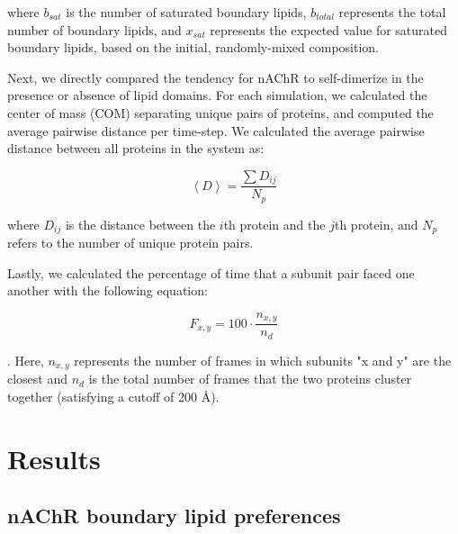 where $b_{sat}$ is the number of saturated boundary lipids, $b_{total}$ represents the total number of boundary lipids, and $x_{sat}$ represents the expected value for saturated boundary lipids, based on the initial, randomly-mixed composition.   



  

Next, we directly compared the tendency for nAChR to self-dimerize in the presence or absence of lipid domains. For each simulation, we calculated the center of mass (COM) separating unique pairs of proteins, and computed the average pairwise distance per time-step. We calculated the average pairwise distance between all proteins in the system as:    


\begin{equation}\label{eq:dimer}
\left\langle D \right\rangle = \frac{\sum D_{ij}}{N_{p}}
\end{equation}

where $D_{ij}$ is the distance between the $i$th protein and the $j$th protein, and $N_{p}$ refers to the number of unique protein pairs. 



Lastly, we calculated the percentage of time that a subunit pair faced one another with the following equation: 

\begin{equation}\label{eq:subunit}
F_{x,y} = 100\cdot \frac{n_{x,y}}{n_d}
\end{equation}

. Here, $n_{x,y}$ represents the number of frames in which subunits "x and y" are the closest and $n_d$ is the total number of frames that the two proteins cluster together (satisfying a cutoff of 200 {\AA}).

\section{Results}

\subsection{nAChR boundary lipid preferences}\label{sec:lipids}

